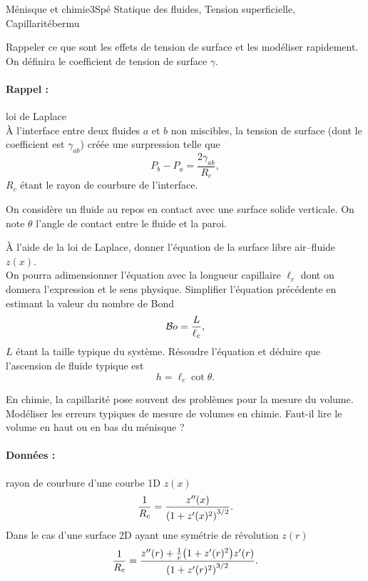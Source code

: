 
\begin{exercise}{Ménisque et chimie}{3}{Spé}
{Statique des fluides, Tension superficielle, Capillarité}{bermu}

\begin{questions}
    \questioncours Rappeler ce que sont les effets de tension de surface et les modéliser rapidement. On définira le coefficient de tension de surface $\gamma$.
\begin{EnvUplevel}
\paragraph{Rappel :} loi de Laplace \\
\`A l'interface entre deux fluides $a$ et $b$ non miscibles, la tension de surface (dont le coefficient est $\gamma_{ab}$) créée une surpression telle que
$$P_b - P_a = \dfrac{2\gamma_{ab}}{R_c},$$
$R_c$ étant le rayon de courbure de l'interface.

\bigskip

On considère un fluide au repos en contact avec une surface solide verticale. On note $\theta$ l'angle de contact entre le fluide et la paroi.

\end{EnvUplevel}
    \question \`A l'aide de la loi de Laplace, donner l'équation de la surface libre air--fluide $z(x)$. \\
    On pourra adimensionner l'équation avec la longueur capillaire $\ell_c$ dont on donnera l'expression et le sens physique.
    \question Simplifier l'équation précédente en estimant la valeur du nombre de Bond
$$\cal{B}o = \dfrac{L}{\ell_c},$$
$L$ étant la taille typique du système.
    \question Résoudre l'équation et déduire que l'ascension de fluide typique est
$$h = \ell_c \cot\theta.$$
\end{questions}

\plusloin

En chimie, la capillarité pose souvent des problèmes pour la mesure du volume. Modéliser les erreurs typiques de mesure de volumes en chimie. Faut-il lire le volume en haut ou en bas du ménisque ?

\paragraph{Données :} rayon de courbure d'une courbe 1D $z(x)$
$$\dfrac{1}{R_c} = \dfrac{z''(x)}{\qty(1 + z'(x)^2)^{3/2}}.$$
Dans le cas d'une surface 2D ayant une symétrie de révolution $z(r)$
$$\dfrac{1}{R_c} = \dfrac{z''(r) + \frac{1}{r}\qty(1 + z'(r)^2)z'(r)}{\qty(1 + z'(r)^2)^{3/2}}.$$
\end{exercise}